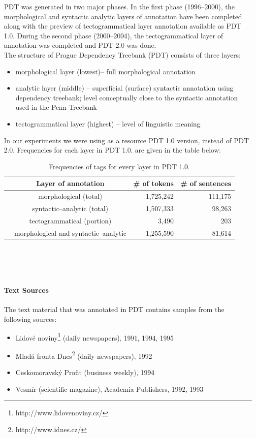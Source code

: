 PDT was generated in two major phases. In the first phase (1996--2000), the morphological and syntactic analytic  layers of annotation have been completed along with the preview of tectogrammatical layer annotation available as  PDT 1.0. During the second phase (2000--2004), the tectogrammatical layer of annotation was completed and PDT 2.0 was done.
\\The structure of Prague Dependency Treebank (PDT) consists of three layers:
\begin{itemize}
\item morphological layer (lowest)-- full morphological annotation
\item analytic  layer (middle) -- superficial (surface) syntactic annotation using dependency treebank; level conceptually close to the syntactic annotation used in the Penn Treebank 
\item tectogrammatical layer (highest) -- level of linguistic meaning
\end{itemize}
In our experiments we were using as a resource PDT 1.0 version, instead of PDT 2.0. Frequencies for each layer in PDT 1.0. are given in the table below:
\begin{table}[h!]
\begin{center}
	\begin{tabular}{ l  c  | r r }
   	& Layer of annotation   & \# of tokens & \# of sentences \\
	\hline                       
	& morphological (total) & 1,725,242 & 111,175\\
	& syntactic--analytic (total) & 1,507,333 & 98,263 \\
  	& tectogrammatical (portion) & 3,490 &  203 \\
	& morphological and syntactic--analytic & 1,255,590 & 81,614 \\
	\end{tabular}
\end{center}
\caption{Frequencies of tags for every layer in PDT 1.0.}
\end{table}
\\\\\\\\
\textbf{Text Sources}
\\\\The text material that was annotated in PDT contains samples from the following sources:
\begin{itemize}
\item Lidov\'e noviny\footnote{http://www.lidovenoviny.cz/} (daily newspapers), 1991, 1994, 1995
\item Mlad\'a fronta Dnes\footnote{http://www.idnes.cz/} (daily newspapers), 1992
\item Ceskomoravsk\'y Profit (business weekly), 1994
\item Vesm\'ir (scientific magazine), Academia Publishers, 1992, 1993
\end{itemize}

